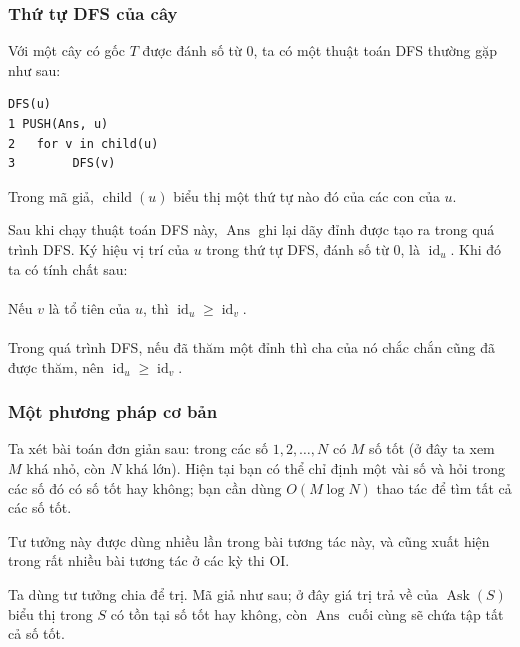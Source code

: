 \documentclass[11pt]{article}
\begin{document}
\subsubsection{Thứ tự DFS của cây}

Với một cây có gốc \(T\) được đánh số từ \(0\), ta có một thuật toán DFS thường
gặp như sau:

\begin{verbatim}
DFS(u)
1 PUSH(Ans, u)
2   for v in child(u)
3        DFS(v)
\end{verbatim}

Trong mã giả, \(\operatorname{child}(u)\) biểu thị một thứ tự nào đó của các
con của \(u\).

Sau khi chạy thuật toán DFS này, \(\operatorname{Ans}\) ghi lại dãy đỉnh được
tạo ra trong quá trình DFS. Ký hiệu vị trí của \(u\) trong thứ tự DFS, đánh số
từ \(0\), là \(\operatorname{id}_u\). Khi đó ta có tính chất sau:

\paragraph{}
Nếu \(v\) là tổ tiên của \(u\), thì \(\operatorname{id}_u\ge
\operatorname{id}_v\).

\paragraph{}
Trong quá trình DFS, nếu đã thăm một đỉnh thì cha của nó chắc chắn cũng đã được
thăm, nên \(\operatorname{id}_u\ge \operatorname{id}_v\).

\subsubsection{Một phương pháp cơ bản}

Ta xét bài toán đơn giản sau: trong các số \(1,2,\ldots,N\) có \(M\) số tốt (ở
đây ta xem \(M\) khá nhỏ, còn \(N\) khá lớn). Hiện tại bạn có thể chỉ định một
vài số và hỏi trong các số đó có số tốt hay không; bạn cần dùng \(O(M\log N)\)
thao tác để tìm tất cả các số tốt.

Tư tưởng này được dùng nhiều lần trong bài tương tác này, và cũng xuất hiện
trong rất nhiều bài tương tác ở các kỳ thi OI.

Ta dùng tư tưởng chia để trị. Mã giả như sau; ở đây giá trị trả về của
\(\operatorname{Ask}(S)\) biểu thị trong \(S\) có tồn tại số tốt hay không, còn
\(\operatorname{Ans}\) cuối cùng sẽ chứa tập tất cả số tốt.
\end{document}
